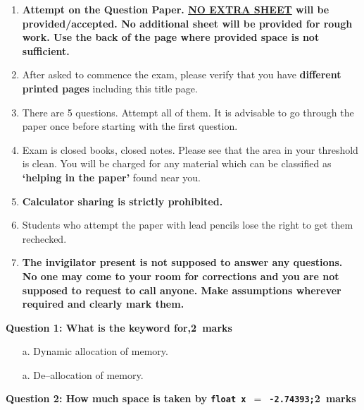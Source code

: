 \documentclass[12pt,a4paper]{article}
\def\QOne{2}
\def\Qtwo{2}
\begin{document}
\begin{enumerate}
\item \textbf{Attempt on the Question Paper. \underline{NO EXTRA SHEET} will be provided/accepted. No
additional sheet will be provided for rough work. Use the back of the page where
provided space is not sufficient.}
\item After asked to commence the exam, please verify that you have \textbf{\pageref{LastPage} different
printed pages} including this title page.
\item There are 5 questions. Attempt all of them. It is advisable to go through the paper once
before starting with the first question.
\item Exam is closed books, closed notes. Please see that the area in your threshold is clean.
You will be charged for any material which can be classified as \textbf{`helping in the paper'}
found near you.
\item \textbf{Calculator sharing is strictly prohibited.}
\item Students who attempt the paper with lead pencils lose the right to get them rechecked.
\item \textbf{The invigilator present is not supposed to answer any questions. No one may come
to your room for corrections and you are not supposed to request to call anyone.
Make assumptions wherever required and clearly mark them.}
\end{enumerate}
\newpage
\noindent\textbf{Question 1: What is the keyword for,\hfill \QOne~marks}\\
\begin{enumerate}
\item[a.] Dynamic allocation of memory.
\begin{figure}[H]
\end{figure}
\item[a.] De--allocation of memory.
\begin{figure}[H]
\end{figure}
\end{enumerate}
\noindent\textbf{Question 2: How much space is taken by \texttt{float x $=$ -2.74393;}\hfill \Qtwo~marks}\\
\end{document}
